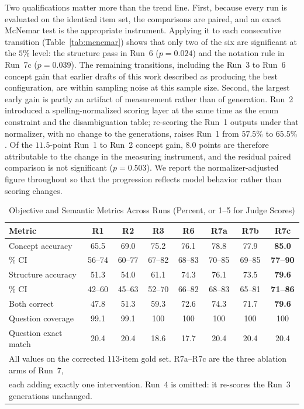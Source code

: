 \documentclass[onecolumn, 11pt]{IEEEtran}
\begin{document}
Two qualifications matter more than the trend line. First, because every run is evaluated on the identical item set, the comparisons are paired, and an exact McNemar test is the appropriate instrument. Applying it to each consecutive transition (Table~\ref{tab:mcnemar}) shows that only two of the six are significant at the $5\%$ level: the structure pass in Run~6 ($p=0.024$) and the notation rule in Run~7c ($p=0.039$). The remaining transitions, including the Run~3 to Run~6 concept gain that earlier drafts of this work described as producing the best configuration, are within sampling noise at this sample size. Second, the largest early gain is partly an artifact of measurement rather than of generation. Run~2 introduced a spelling-normalized scoring layer at the same time as the enum constraint and the disambiguation table; re-scoring the Run~1 outputs under that normalizer, with no change to the generations, raises Run~1 from $57.5\%$ to $65.5\%$. Of the $11.5$-point Run~1 to Run~2 concept gain, $8.0$ points are therefore attributable to the change in the measuring instrument, and the residual paired comparison is not significant ($p=0.503$). We report the normalizer-adjusted figure throughout so that the progression reflects model behavior rather than scoring changes.

\begin{table}[t]
\caption{Objective and Semantic Metrics Across Runs (Percent, or 1--5 for Judge Scores)}
\label{tab:main}
\centering
\footnotesize
\begin{tabular}{l c c c c c c c}
\hline
\textbf{Metric} & \textbf{R1} & \textbf{R2} & \textbf{R3} & \textbf{R6} & \textbf{R7a} & \textbf{R7b} & \textbf{R7c} \\
\hline
Concept accuracy & 65.5 & 69.0 & 75.2 & 76.1 & 78.8 & 77.9 & \textbf{85.0} \\
\quad 95\% CI & \scriptsize 56--74 & \scriptsize 60--77 & \scriptsize 67--82 & \scriptsize 68--83 & \scriptsize 70--85 & \scriptsize 69--85 & \scriptsize \textbf{77--90} \\
Structure accuracy & 51.3 & 54.0 & 61.1 & 74.3 & 76.1 & 73.5 & \textbf{79.6} \\
\quad 95\% CI & \scriptsize 42--60 & \scriptsize 45--63 & \scriptsize 52--70 & \scriptsize 66--82 & \scriptsize 68--83 & \scriptsize 65--81 & \scriptsize \textbf{71--86} \\
Both correct & 47.8 & 51.3 & 59.3 & 72.6 & 74.3 & 71.7 & \textbf{79.6} \\
Question coverage & 99.1 & 99.1 & 100 & 100 & 100 & 100 & 100 \\
Question exact match & 20.4 & 20.4 & 18.6 & 17.7 & 20.4 & 20.4 & 20.4 \\
\hline
\multicolumn{8}{l}{\scriptsize All values on the corrected $113$-item gold set. R7a--R7c are the three ablation arms of Run~7,}\\
\multicolumn{8}{l}{\scriptsize each adding exactly one intervention. Run~4 is omitted: it re-scores the Run~3 generations unchanged.}
\end{tabular}
\end{table}
\end{document}
